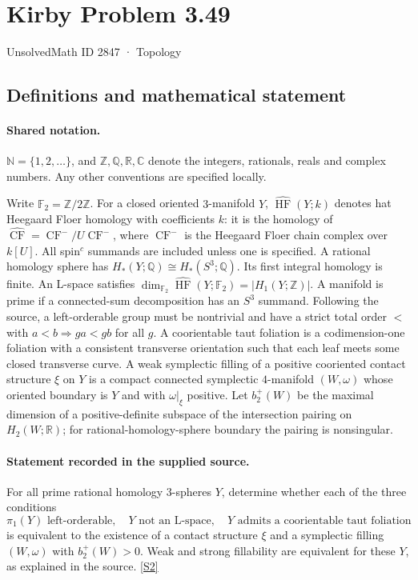 \documentclass[11pt]{article}
\newcommand{\sref}[2]{\hyperlink{source:#1:#2}{[S#2]}}
\begin{document}
\setcounter{section}{2846}
\section{Kirby Problem 3.49}\label{2847}
{\small\sffamily UnsolvedMath ID 2847 · Topology}
\subsection{Definitions and mathematical statement}

\paragraph{Shared notation.}$\mathbb N=\{1,2,\ldots\}$, and $\mathbb Z,\mathbb Q,\mathbb R,\mathbb C$ denote the integers, rationals, reals and complex numbers. Any other conventions are specified locally.


Write $\mathbb F_2=\mathbb Z/2\mathbb Z$. For a closed oriented $3$-manifold $Y$, $\widehat{\operatorname{HF}}(Y;k)$ denotes hat Heegaard Floer homology with coefficients $k$: it is the homology of $\widehat{\operatorname{CF}}=\operatorname{CF}^-/U\operatorname{CF}^-$, where $\operatorname{CF}^-$ is the Heegaard Floer chain complex over $k[U]$. All spin$^c$ summands are included unless one is specified. A rational homology sphere has $H_*(Y;\mathbb Q)\cong H_*(S^3;\mathbb Q)$. Its first integral homology is finite. An L-space satisfies $\dim_{\mathbb F_2}\widehat{\operatorname{HF}}(Y;\mathbb F_2)=|H_1(Y;\mathbb Z)|$. A manifold is prime if a connected-sum decomposition has an $S^3$ summand. Following the source, a left-orderable group must be nontrivial and have a strict total order $<$ with $a<b\Rightarrow ga<gb$ for all $g$. A coorientable taut foliation is a codimension-one foliation with a consistent transverse orientation such that each leaf meets some closed transverse curve. A weak symplectic filling of a positive cooriented contact structure $\xi$ on $Y$ is a compact connected symplectic $4$-manifold $(W,\omega)$ whose oriented boundary is $Y$ and with $\omega|_\xi$ positive. Let $b_2^+(W)$ be the maximal dimension of a positive-definite subspace of the intersection pairing on $H_2(W;\mathbb R)$; for rational-homology-sphere boundary the pairing is nonsingular.
\paragraph{Statement recorded in the supplied source.}
For all prime rational homology $3$-spheres $Y$, determine whether each of the three conditions
\[
\pi_1(Y)\text{ left-orderable},\quad Y\text{ not an L-space},\quad
Y\text{ admits a coorientable taut foliation}
\]
is equivalent to the existence of a contact structure $\xi$ and a symplectic filling $(W,\omega)$ with $b_2^+(W)>0$. Weak and strong fillability are equivalent for these $Y$, as explained in the source. \sref{2847}{2}
\end{document}
